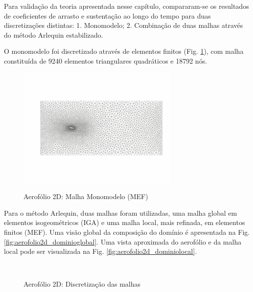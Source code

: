 \documentclass[tese_patricia]{subfiles}
\begin{document}
Para validação da teoria apresentada nesse capítulo, compararam-se os resultados de coeficientes de arrasto e sustentação ao longo do tempo para duas discretizações distintas: 1. Monomodelo; 2. Combinação de duas malhas através do método Arlequin estabilizado.

O monomodelo foi discretizado através de elementos finitos (Fig. \ref{fig:aerofolio2d_malhamonomodelomef}), com malha constituída de 9240 elementos triangulares quadráticos e 18792 nós. 

\begin{figure}[htb!]
	\centering 
	{\includegraphics[scale=2.5,trim=0cm 0.9cm 0cm 0.8cm, clip=true]{Imagens/Cap6/malhaMonoEstatica.pdf}}	
	\caption{Aerofólio 2D: Malha Monomodelo (MEF) }
	\label{fig:aerofolio2d_malhamonomodelomef}
\end{figure}


Para o método Arlequin, duas malhas foram utilizadas, uma malha global em elementos isogeométricos (IGA) e uma malha local, mais refinada, em elementos finitos (MEF). Uma visão global da composição do domínio é apresentada na Fig. \ref{fig:aerofolio2d_dominioglobal}. Uma vista aproximada do aerofólio e da malha local pode ser visualizada na Fig. \ref{fig:aerofolio2d_dominiolocal}.

\begin{figure}[!htb]
	\centering
	\\
	\caption{Aerofólio 2D: Discretização das malhas}
	\label{fig:aerofolio2d_malhasepatches}
\end{figure}
\end{document}
